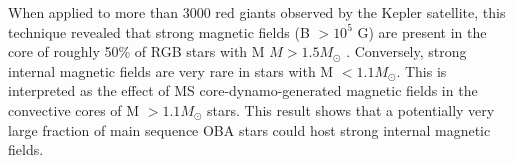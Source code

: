 When applied to more than 3000 red giants observed by the Kepler satellite, this technique revealed that
strong magnetic fields (B $> 10^5$ G) are present in the core of roughly 50\% of RGB stars with M $M > 1.5M_\odot$ \citep{Stello_2016,Stello_2016a}.
Conversely, strong internal magnetic fields are very rare in stars with M $< 1.1M_\odot$. This is interpreted as the
effect of MS core-dynamo-generated magnetic fields in the convective cores of M $> 1.1M_\odot$ stars.
This result shows that a potentially very large fraction of main sequence OBA stars could host strong internal magnetic fields.



